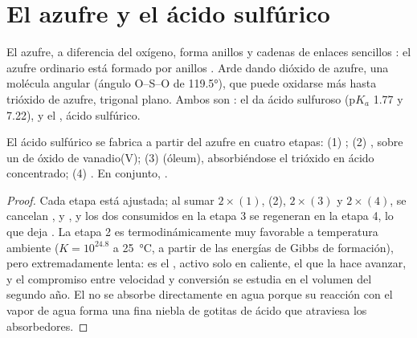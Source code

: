 \section{El azufre y el ácido sulfúrico}

El azufre, a diferencia del oxígeno, forma anillos y cadenas de enlaces
sencillos : el azufre ordinario está formado por anillos .
Arde dando dióxido de azufre, una molécula angular (ángulo O--S--O de
\ang{119.5}), que puede oxidarse más hasta trióxido de azufre, trigonal
plano. Ambos son : el  da ácido sulfuroso
($\mathrm{p}K_a$ 1.77 y 7.22), y el , ácido sulfúrico.

\begin{proposition}\label{prop:b1:p-block-16-18:contact-steps}
El ácido sulfúrico se fabrica a partir del azufre en cuatro etapas:
(1) ; (2) , sobre un
 de óxido de vanadio(V); (3) 
(óleum), absorbiéndose el trióxido en ácido concentrado;
(4) . En conjunto,
.
\end{proposition}

\begin{proof}
Cada etapa está ajustada; al sumar $2\times(1)$, (2), $2\times(3)$ y
$2\times(4)$, se cancelan ,  y , y los dos
 consumidos en la etapa 3 se regeneran en la etapa 4, lo que
deja . La etapa 2 es termodinámicamente
muy favorable a temperatura ambiente ($K = 10^{24.8}$ a
\qty{25}{\celsius}, a partir de las energías de Gibbs de formación), pero
extremadamente lenta: es el , activo solo en caliente, el que
la hace avanzar, y el compromiso entre velocidad y conversión se estudia
en el volumen del segundo año. El  no se absorbe directamente en
agua porque su reacción con el vapor de agua forma una fina niebla de
gotitas de ácido que atraviesa los absorbedores.
\end{proof}

